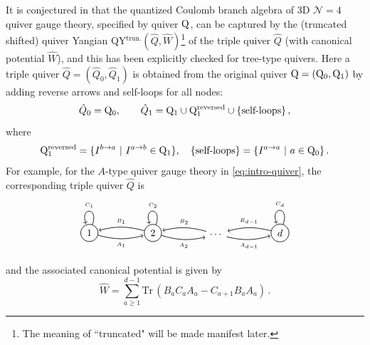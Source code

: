 \documentclass[12pt,a4paper]{article}
\begin{document}
It is conjectured in \cite{ChenLi2026} that the quantized Coulomb branch algebra of 3D $\mathcal N=4$ quiver gauge theory, specified by quiver $\rm Q$, can be captured by the (truncated shifted) quiver Yangian QY$^{\text{trun.}}(\hat Q,\hat W)$\footnote{The meaning of ``truncated" will be made manifest later.} of the triple quiver $\hat Q$ (with canonical potential $\hat W$), and this has been explicitly checked for tree-type quivers. Here a triple quiver $\hat Q=(\hat Q_0,\hat Q_1)$ is obtained from the original quiver $\rm Q=(\rm Q_0,\rm Q_1)$ by adding reverse arrows and self-loops for all nodes:
\begin{equation}
    \hat{Q}_0=\mathrm{Q}_0,\qquad \hat{Q}_1= \rm Q_1\cup \rm Q_1^{\text{reversed}}\cup \{\text{self-loops}\}\,,
\end{equation}
where
\begin{equation}
    \mathrm{Q}_1^{\text{reversed}}=\{I^{b\to a}\ |\ I^{a\to b} \in \mathrm{Q}_1\},\quad \{\text{self-loops}\}=\{I^{a\to a}\ |\ a\in \rm Q_0\}\,.
\end{equation}
For example, for the $A$-type quiver gauge theory in \eqref{eq:intro-quiver}, the corresponding triple quiver $\hat Q$ is 
\begin{equation}
\begin{tikzpicture}
[->,auto=right, node distance=2cm,
			shorten >=1pt, semithick]
\node (v1) at (-2.75,0.2)[circle,draw] {1};
\node (v2) at (-0.5,0.2)[circle,draw] {2};
\node (e) at (1.75,0.15) {$\dots$};
\node (vd) at (4,0.2)[circle,draw] {$d$};


\draw (v2) edge [bend right=15] node {{\tiny $B_1$}} (v1);
\draw (v1) edge [bend right=15] node {{\tiny $A_1$}} (v2);
\draw (v1) edge [in=110,out=70,loop] node {{\tiny $C_1$}} (v1);
			
\draw (v2) edge [bend right=15] node {{\tiny $A_2$}} (e);
\draw (e) edge [bend right=15] node {{\tiny $B_2$}} (v2);
\draw (v2) edge [in=110,out=70,loop] node {{\tiny $C_2$}} (v2);
			
			
\draw (e) edge [bend right=15] node {{\tiny $A_{d-1}$}} (vd);
\draw (vd) edge [bend right=15] node {{\tiny $B_{d-1}$}} (e);
\draw (vd) edge [in=110,out=70,loop] node {{\tiny $C_{d}$}} (vd);

\end{tikzpicture}
\label{eq:A_qui_QY}
\end{equation}
and the associated canonical potential is given by
\begin{equation}\label{eq:A_triple_potential}
\widehat{W}=\sum_{a\geq1}^{d-1}\mathrm{Tr}\,(B_aC_aA_a-C_{a+1}B_aA_a)\,.
\end{equation}
\end{document}
